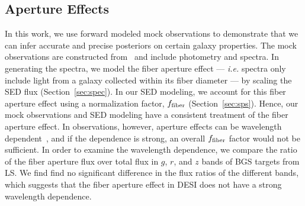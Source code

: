 

\subsection{Aperture Effects}
In this work, we use forward modeled mock observations to demonstrate that we
can infer accurate and precise posteriors on certain galaxy properties.
The mock observations are constructed from \lgal~and include photometry and
spectra. 
In generating the spectra, we model the fiber aperture effect --- \emph{i.e.}
spectra only include light from a galaxy collected within its fiber diameter 
--- by scaling the SED flux (Section~\ref{sec:spec}).
In our SED modeling, we account for this fiber aperture effect using a
normalization factor, $f_{\rm fiber}$ (Section~\ref{sec:sps}). 
Hence, our mock observations and SED modeling have a consistent treatment of
the fiber aperture effect. 
In observations, however, aperture effects can be wavelength
dependent~\citep{gerssen2012, richards2016}, and if the dependence is strong,
an overall $f_{\rm fiber}$ factor would not be sufficient.
In order to examine the wavelength dependence, we compare the ratio of the
fiber aperture flux over total flux in $g$, $r$, and $z$ bands of BGS targets
from LS.
We find find no significant difference in the flux ratios of the different
bands, which suggests that the fiber aperture effect in DESI does not have a
strong wavelength dependence. 

